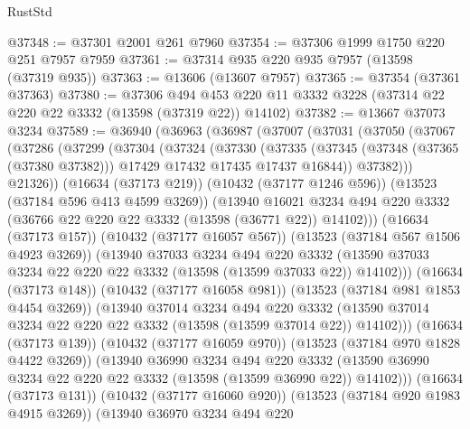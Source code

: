 \begin{lexlean}{RustStd}
\begin{coremodule}
@37348 := @37301 @2001 @261 @7960
@37354 := @37306 @1999 @1750 @220 @251 @7957 @7959
@37361 := @37314 @935 @220 @935 @7957 (@13598 (@37319 @935))
@37363 := @13606 (@13607 @7957)
@37365 := @37354 (@37361 @37363)
@37380 := @37306
    @494
    @453
    @220
    @11
    @3332
    @3228
    (@37314 @22 @220 @22 @3332 (@13598 (@37319 @22)) @14102)
@37382 := @13667 @37073 @3234
@37589 := @36940
    (@36963
      (@36987
        (@37007
          (@37031
            (@37050
              (@37067
                (@37286
                  (@37299
                    (@37304
                      (@37324
                        (@37330
                          (@37335
                            (@37345
                              (@37348 (@37365 (@37380 @37382)))
                              @17429
                              @17432
                              @17435
                              @17437
                              @16844))
                          @37382)))
                    @21326))
                (@16634 (@37173 @219))
                (@10432 (@37177 @1246 @596))
                (@13523 (@37184 @596 @413 @4599 @3269))
                (@13940
                  @16021
                  @3234
                  @494
                  @220
                  @3332
                  (@36766 @22 @220 @22 @3332 (@13598 (@36771 @22)) @14102)))
              (@16634 (@37173 @157))
              (@10432 (@37177 @16057 @567))
              (@13523 (@37184 @567 @1506 @4923 @3269))
              (@13940
                @37033
                @3234
                @494
                @220
                @3332
                (@13590 @37033 @3234 @22 @220 @22 @3332 (@13598 (@13599 @37033 @22)) @14102)))
            (@16634 (@37173 @148))
            (@10432 (@37177 @16058 @981))
            (@13523 (@37184 @981 @1853 @4454 @3269))
            (@13940
              @37014
              @3234
              @494
              @220
              @3332
              (@13590 @37014 @3234 @22 @220 @22 @3332 (@13598 (@13599 @37014 @22)) @14102)))
          (@16634 (@37173 @139))
          (@10432 (@37177 @16059 @970))
          (@13523 (@37184 @970 @1828 @4422 @3269))
          (@13940
            @36990
            @3234
            @494
            @220
            @3332
            (@13590 @36990 @3234 @22 @220 @22 @3332 (@13598 (@13599 @36990 @22)) @14102)))
        (@16634 (@37173 @131))
        (@10432 (@37177 @16060 @920))
        (@13523 (@37184 @920 @1983 @4915 @3269))
        (@13940
          @36970
          @3234
          @494
          @220

\end{coremodule}
\end{lexlean}
